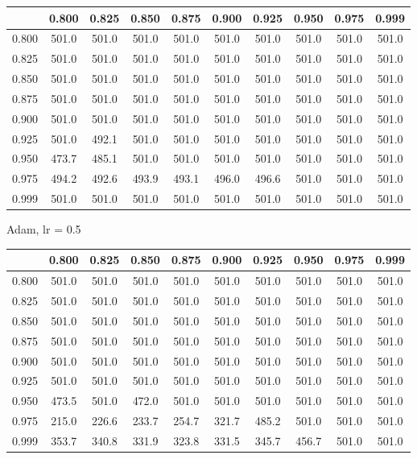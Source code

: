 \documentclass[a4paper,14pt,oneside,openany]{memoir}
\begin{document}
	\begin{tabular}{|c|c|c|c|c|c|c|c|c|c|}
	\hline 
	 &0.800 &0.825 &0.850 &0.875 &0.900 &0.925 &0.950 &0.975 &0.999 \\
	 \hline 
	0.800 &501.0 &501.0 &501.0 &501.0 &501.0 &501.0 &501.0 &501.0 &501.0 \\
	 \hline 
	0.825 &501.0 &501.0 &501.0 &501.0 &501.0 &501.0 &501.0 &501.0 &501.0 \\
	 \hline 
	0.850 &501.0 &501.0 &501.0 &501.0 &501.0 &501.0 &501.0 &501.0 &501.0 \\
	 \hline 
	0.875 &501.0 &501.0 &501.0 &501.0 &501.0 &501.0 &501.0 &501.0 &501.0 \\
	 \hline 
	0.900 &501.0 &501.0 &501.0 &501.0 &501.0 &501.0 &501.0 &501.0 &501.0 \\
	 \hline 
	0.925 &501.0 &492.1 &501.0 &501.0 &501.0 &501.0 &501.0 &501.0 &501.0 \\
	 \hline 
	0.950 &473.7 &485.1 &501.0 &501.0 &501.0 &501.0 &501.0 &501.0 &501.0 \\
	 \hline 
	0.975 &494.2 &492.6 &493.9 &493.1 &496.0 &496.6 &501.0 &501.0 &501.0 \\
	 \hline 
	0.999 &501.0 &501.0 &501.0 &501.0 &501.0 &501.0 &501.0 &501.0 &501.0 \\
	 \hline 
	
	\end{tabular}
	
	Adam, lr = 0.5 
	
	\begin{tabular}{|c|c|c|c|c|c|c|c|c|c|}
	\hline 
	 &0.800 &0.825 &0.850 &0.875 &0.900 &0.925 &0.950 &0.975 &0.999 \\
	 \hline 
	0.800 &501.0 &501.0 &501.0 &501.0 &501.0 &501.0 &501.0 &501.0 &501.0 \\
	 \hline 
	0.825 &501.0 &501.0 &501.0 &501.0 &501.0 &501.0 &501.0 &501.0 &501.0 \\
	 \hline 
	0.850 &501.0 &501.0 &501.0 &501.0 &501.0 &501.0 &501.0 &501.0 &501.0 \\
	 \hline 
	0.875 &501.0 &501.0 &501.0 &501.0 &501.0 &501.0 &501.0 &501.0 &501.0 \\
	 \hline 
	0.900 &501.0 &501.0 &501.0 &501.0 &501.0 &501.0 &501.0 &501.0 &501.0 \\
	 \hline 
	0.925 &501.0 &501.0 &501.0 &501.0 &501.0 &501.0 &501.0 &501.0 &501.0 \\
	 \hline 
	0.950 &473.5 &501.0 &472.0 &501.0 &501.0 &501.0 &501.0 &501.0 &501.0 \\
	 \hline 
	0.975 &215.0 &226.6 &233.7 &254.7 &321.7 &485.2 &501.0 &501.0 &501.0 \\
	 \hline 
	0.999 &353.7 &340.8 &331.9 &323.8 &331.5 &345.7 &456.7 &501.0 &501.0 \\
	 \hline 
	
	\end{tabular}
	
\end{document}
